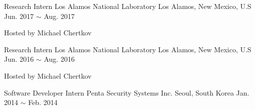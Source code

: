 \begin{cventries}
  \cventry
    {Research Intern}
    {Los Alamos National Laboratory}
    {Los Alamos, New Mexico, U.S}
    {Jun. 2017 $\sim$ Aug. 2017}
    {
    \begin{cvitems} %
        \item{Hosted by Michael Chertkov}
    \end{cvitems}
    }
    \vspace{.1in}

  \cventry
    {Research Intern}
    {Los Alamos National Laboratory}
    {Los Alamos, New Mexico, U.S}
    {Jun. 2016 $\sim$ Aug. 2016}
    {
    \begin{cvitems} %
        \item{Hosted by Michael Chertkov}
    \end{cvitems}
    }
    \vspace{.1in}

  \cventry
    {Software Developer Intern}
    {Penta Security Systems Inc.}
    {Seoul, South Korea}
    {Jan. 2014 $\sim$ Feb. 2014}{}
\end{cventries}
